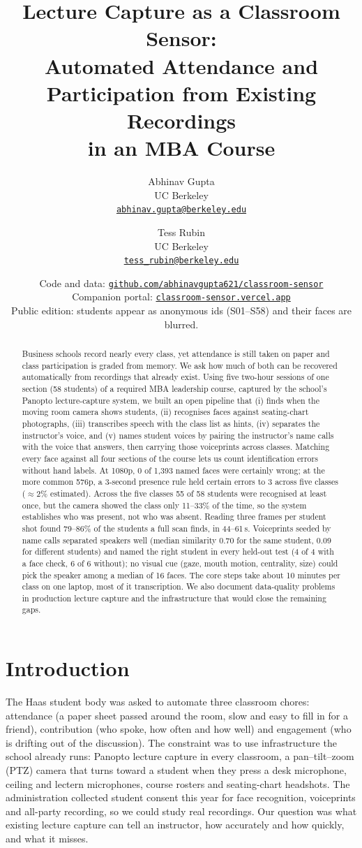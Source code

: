 \documentclass[10pt,twocolumn,letterpaper]{article}
\title{\vspace{-1.2em}\Large\textbf{Lecture Capture as a Classroom Sensor:\\Automated Attendance and Participation from Existing Recordings\\in an MBA Course}}
\author{Abhinav Gupta\\\small UC Berkeley\\\small\href{mailto:abhinav.gupta@berkeley.edu}{\texttt{abhinav.gupta@berkeley.edu}} \and Tess Rubin\\\small UC Berkeley\\\small\href{mailto:tess_rubin@berkeley.edu}{\texttt{tess\_rubin@berkeley.edu}}}
\date{\small Code and data: \href{https://github.com/abhinavgupta621/classroom-sensor}{\texttt{github.com/abhinavgupta621/classroom-sensor}}\\\small Companion portal: \href{https://classroom-sensor.vercel.app}{\texttt{classroom-sensor.vercel.app}}\\\small Public edition: students appear as anonymous ids (S01--S58) and their faces are blurred.}
\begin{document}
\maketitle

\begin{abstract}
Business schools record nearly every class, yet attendance is still taken on paper and class participation is graded from memory. We ask how much of both can be recovered automatically from recordings that already exist. Using five two-hour sessions of one section (58 students) of a required MBA leadership course, captured by the school's Panopto lecture-capture system, we built an open pipeline that (i) finds when the moving room camera shows students, (ii) recognises faces against seating-chart photographs, (iii) transcribes speech with the class list as hints, (iv) separates the instructor's voice, and (v) names student voices by pairing the instructor's name calls with the voice that answers, then carrying those voiceprints across classes. Matching every face against all four sections of the course lets us count identification errors without hand labels. At 1080p, 0 of 1{,}393 named faces were certainly wrong; at the more common 576p, a 3-second presence rule held certain errors to 3 across five classes ($\approx$2\% estimated). Across the five classes 55 of 58 students were recognised at least once, but the camera showed the class only 11--33\% of the time, so the system establishes who was present, not who was absent. Reading three frames per student shot found 79--86\% of the students a full scan finds, in 44--61\,s. Voiceprints seeded by name calls separated speakers well (median similarity 0.70 for the same student, 0.09 for different students) and named the right student in every held-out test (4 of 4 with a face check, 6 of 6 without); no visual cue (gaze, mouth motion, centrality, size) could pick the speaker among a median of 16 faces. The core steps take about 10 minutes per class on one laptop, most of it transcription. We also document data-quality problems in production lecture capture and the infrastructure that would close the remaining gaps.
\end{abstract}

\section{Introduction}
The Haas student body was asked to automate three classroom chores: attendance (a paper sheet passed around the room, slow and easy to fill in for a friend), contribution (who spoke, how often and how well) and engagement (who is drifting out of the discussion). The constraint was to use infrastructure the school already runs: Panopto lecture capture in every classroom, a pan--tilt--zoom (PTZ) camera that turns toward a student when they press a desk microphone, ceiling and lectern microphones, course rosters and seating-chart headshots. The administration collected student consent this year for face recognition, voiceprints and all-party recording, so we could study real recordings. Our question was what existing lecture capture can tell an instructor, how accurately and how quickly, and what it misses.
\end{document}
